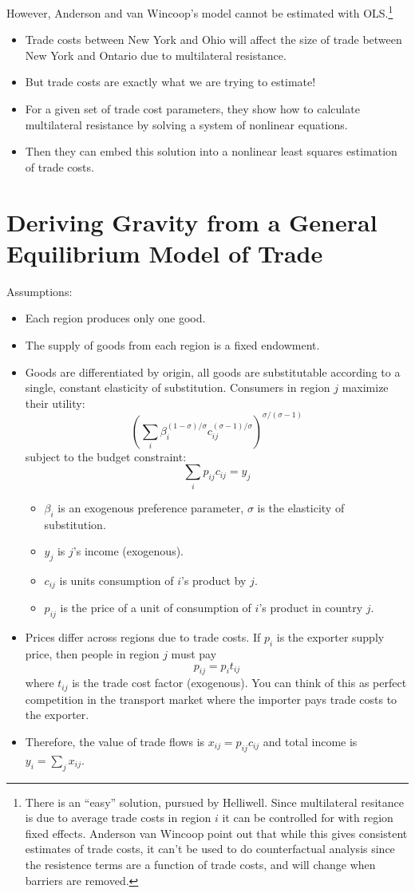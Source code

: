 \documentclass[twoside]{article}
\begin{document}
However, Anderson and van Wincoop's model cannot be estimated with OLS.\footnote{There is an ``easy'' solution, pursued by Helliwell. Since multilateral resitance is due to average trade costs in region $i$ it can be controlled for with region fixed effects. Anderson van Wincoop point out that while this gives consistent estimates of trade costs, it can't be used to do counterfactual analysis since the resistence terms are a function of trade costs, and will change when barriers are removed.}   
\begin{itemize}
\item Trade costs between New York and Ohio will affect the size of trade between New York and Ontario due to multilateral resistance. 
\item But trade costs are exactly what we are trying to estimate!
\item For a given set of trade cost parameters, they show how to calculate multilateral resistance by solving a system of nonlinear equations. 
\item Then they can embed this solution into a nonlinear least squares estimation of trade costs. 
\end{itemize}

\section{Deriving Gravity from a General Equilibrium Model of Trade}

Assumptions: 
\begin{itemize}
\item Each region produces only one good. 
\item The supply of goods from each region is a fixed endowment.  
\item Goods are differentiated by origin, all goods are substitutable according to a single, constant elasticity of substitution.  Consumers in region $j$ maximize their utility: 
$$ \left( \sum_i \beta_i^{(1-\sigma)/\sigma} c_{ij}^{(\sigma -1)/\sigma} \right)^{\sigma / (\sigma - 1)} $$
subject to the budget constraint:
$$ \sum_i p_{ij} c_{ij} = y_j $$
\begin{itemize}
  \item $\beta_i$ is an exogenous preference parameter, $\sigma$ is the elasticity of substitution. 
  \item $y_j$ is $j$'s income (exogenous).   
  \item $c_{ij}$ is units consumption of $i$'s product by $j$. 
  \item $p_{ij}$ is the price of a unit of consumption of $i$'s product in country $j$. 
\end{itemize}
\item Prices differ across regions due to trade costs. If $p_i$ is the exporter supply price, then people in region $j$ must pay 
$$ p_{ij} = p_i t_{ij} $$
where $t_{ij}$ is the trade cost factor (exogenous). You can think of this as perfect competition in the transport market where the importer pays trade costs to the exporter. 
\item Therefore, the value of trade flows is  $x_{ij} = p_{ij}c_{ij}$ and total income is $y_i = \sum_j x_{ij}$. 
\end{itemize}
\end{document}
